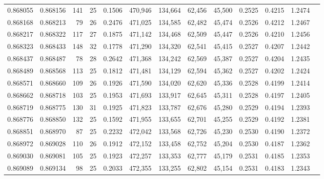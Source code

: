 \begin{tabular}{rrrrrrrrrrrrr}
0.868055 & 0.868156 &   141 &  25 &                                     0.1506 & 470,946 & 134,664 &  62,456 &  45,500 & 0.2525 & 0.4215 & 1.2474 \\
0.868168 & 0.868213 &    79 &  26 &                                     0.2476 & 471,025 & 134,585 &  62,482 &  45,474 & 0.2526 & 0.4212 & 1.2467 \\
0.868217 & 0.868322 &   117 &  27 &                                     0.1875 & 471,142 & 134,468 &  62,509 &  45,447 & 0.2526 & 0.4210 & 1.2456 \\
0.868323 & 0.868433 &   148 &  32 &                                     0.1778 & 471,290 & 134,320 &  62,541 &  45,415 & 0.2527 & 0.4207 & 1.2442 \\
0.868437 & 0.868487 &    78 &  28 &                                     0.2642 & 471,368 & 134,242 &  62,569 &  45,387 & 0.2527 & 0.4204 & 1.2435 \\
0.868489 & 0.868568 &   113 &  25 &                                     0.1812 & 471,481 & 134,129 &  62,594 &  45,362 & 0.2527 & 0.4202 & 1.2424 \\
0.868571 & 0.868660 &   109 &  26 &                                     0.1926 & 471,590 & 134,020 &  62,620 &  45,336 & 0.2528 & 0.4199 & 1.2414 \\
0.868662 & 0.868718 &   103 &  25 &                                     0.1953 & 471,693 & 133,917 &  62,645 &  45,311 & 0.2528 & 0.4197 & 1.2405 \\
0.868719 & 0.868775 &   130 &  31 &                                     0.1925 & 471,823 & 133,787 &  62,676 &  45,280 & 0.2529 & 0.4194 & 1.2393 \\
0.868776 & 0.868850 &   132 &  25 &                                     0.1592 & 471,955 & 133,655 &  62,701 &  45,255 & 0.2529 & 0.4192 & 1.2381 \\
0.868851 & 0.868970 &    87 &  25 &                                     0.2232 & 472,042 & 133,568 &  62,726 &  45,230 & 0.2530 & 0.4190 & 1.2372 \\
0.868972 & 0.869028 &   110 &  26 &                                     0.1912 & 472,152 & 133,458 &  62,752 &  45,204 & 0.2530 & 0.4187 & 1.2362 \\
0.869030 & 0.869081 &   105 &  25 &                                     0.1923 & 472,257 & 133,353 &  62,777 &  45,179 & 0.2531 & 0.4185 & 1.2353 \\
0.869089 & 0.869134 &    98 &  25 &                                     0.2033 & 472,355 & 133,255 &  62,802 &  45,154 & 0.2531 & 0.4183 & 1.2343 \\

\end{tabular}
